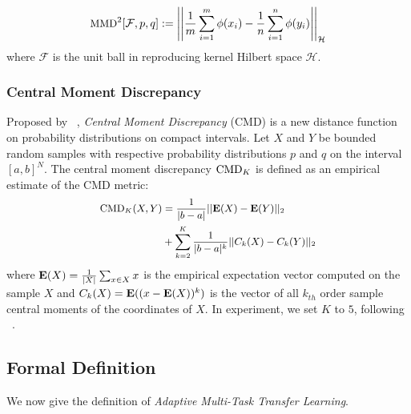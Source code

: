 { %
\begin{equation}
 \small
\textnormal{MMD}^2[\mathcal{F}, p, q] := \left|\left|\frac{1}{m}\sum_{i=1}^m\phi(x_i) - \frac{1}{n}\sum_{i=1}^n\phi(y_i)\right|\right|_\mathcal{H}
\end{equation}
where $\mathcal{F}$ is the unit ball in reproducing kernel Hilbert space $\mathcal{H}$.

\subsubsection{Central Moment Discrepancy}

Proposed by ~\cite{DBLP:journals/corr/ZellingerGLNS17}, {\em Central Moment Discrepancy} (CMD) is a new distance function on probability distributions on compact intervals. Let $X$ and $Y$ be bounded random samples with respective probability distributions $p$ and $q$ on the interval $[a, b]^N$. The central moment discrepancy $\textnormal{CMD}_K$ is defined as an empirical estimate of the CMD metric:
\begin{equation}
\small
\begin{aligned}
\textnormal{CMD}_K(X, Y) &= \frac{1}{|b-a|}||\textnormal{\textbf{E}}(X)-\textnormal{\textbf{E}}(Y)||_2 \\&+ \sum_{k=2}^K{\frac{1}{|b-a|^k}}||C_k(X)-C_k(Y)||_2
\end{aligned}
\end{equation}
where $\textnormal{\textbf{E}}(X) = \frac{1}{|X|}\sum_{x\in X}x$ is the empirical expectation vector computed on the sample $X$ and $C_k(X) = \textnormal{\textbf{E}}((x - \textnormal{\textbf{E}}(X))^k)$ is the vector of all $k_{th}$ order sample central moments of the coordinates of $X$. In experiment, we set $K$ to $5$, following ~\cite{DBLP:journals/corr/ZellingerGLNS17}.

}%

\subsection{Formal Definition}
We now give the definition of \textit{Adaptive Multi-Task Transfer Learning}.

